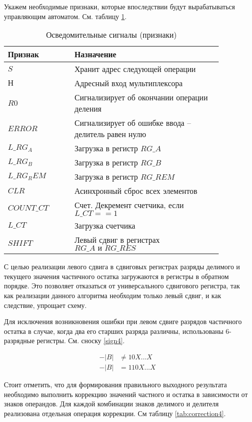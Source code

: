 \documentclass[a4paper,14pt]{extarticle}
\begin{document}
Укажем необходимые признаки, которые впоследствии будут вырабатываться управляющим автоматом. См. таблицу \ref{tab:signals4}.
\begin{table}[h!]
	\centering
	\begin{tabular}{|m{0.27\linewidth}|m{0.6\linewidth}|}
		\hline
		\textbf{Признак} & \textbf{Назначение} \\ \hline
		$S$ & Хранит адрес следующей операции \\ \hline
		$Н$ & Адресный вход мультиплексора \\ \hline
		$R0$ & Сигнализирует об окончании операции деления \\ \hline
		$ERROR$ & Сигнализирует об ошибке ввода -- делитель равен нулю \\ \hline
		$L\_RG_A$ & Загрузка в регистр $RG\_A$ \\ \hline
		$L\_RG_B$ & Загрузка в регистр $RG\_B$ \\ \hline
		$L\_RG_REM$ & Загрузка в регистр $RG\_REM$ \\ \hline
		$CLR$ & Асинхронный сброс всех элементов \\ \hline
		$COUNT\_CT$ & Счет. Декремент счетчика, если $L\_CT==1$ \\ \hline
		$L\_CT$ & Загрузка счетчика \\ \hline
		$SHIFT$ & Левый сдвиг в регистрах $RG\_A \text{ и } RG\_RES$ \\ \hline
	\end{tabular}
	\caption{Осведомительные сигналы (признаки)}
	\label{tab:signals4}
\end{table}
С целью реализации левого сдвига в сдвиговых регистрах разряды делимого и текущего значения частичного остатка загружаются в регистры в обратном порядке. Это позволяет отказаться от универсального сдвигового регистра, так как реализации данного алгоритма необходим только левый сдвиг, и как следствие, упрощает схему. 

Для исключения возникновения ошибки при левом сдвиге разрядов частичного остатка в случае, когда два его старших разряда различны, использованы 6-разрядные регистры. См. сноску \ref{sign4}.

\begin{equation}
\begin{aligned}
\label{sign4}
-|B| &\neq 10X...X \\
-|B| &= 110X...X
\end{aligned}
\end{equation}

Стоит отметить, что для формирования правильного выходного результата необходимо выполнить коррекцию значений частного и остатка в зависимости от знаков операндов. Для каждой комбинации знаков делимого и делителя реализована отдельная операция коррекции. См таблицу \ref{tab:correction4}.
\end{document}
